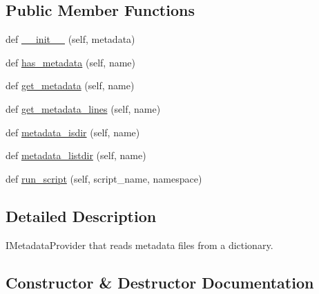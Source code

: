 \subsection*{Public Member Functions}
\begin{DoxyCompactItemize}
\item 
def \hyperlink{classpip_1_1__internal_1_1utils_1_1pkg__resources_1_1DictMetadata_adc3684b3afd09b7499b708c7e9e97de9}{\+\_\+\+\_\+init\+\_\+\+\_\+} (self, metadata)
\item 
def \hyperlink{classpip_1_1__internal_1_1utils_1_1pkg__resources_1_1DictMetadata_a7af10f0f2a69c9e46d96e121dd5c36ea}{has\+\_\+metadata} (self, name)
\item 
def \hyperlink{classpip_1_1__internal_1_1utils_1_1pkg__resources_1_1DictMetadata_a786bc2457039886cd8a89039493526c3}{get\+\_\+metadata} (self, name)
\item 
def \hyperlink{classpip_1_1__internal_1_1utils_1_1pkg__resources_1_1DictMetadata_a6eeb861c7325f20d7b3338b7489daec0}{get\+\_\+metadata\+\_\+lines} (self, name)
\item 
def \hyperlink{classpip_1_1__internal_1_1utils_1_1pkg__resources_1_1DictMetadata_aa99ca5e0c4dd4d5f3ab8a8cdf1a023f5}{metadata\+\_\+isdir} (self, name)
\item 
def \hyperlink{classpip_1_1__internal_1_1utils_1_1pkg__resources_1_1DictMetadata_ad5751d4dc43029799017b29c5dda18d0}{metadata\+\_\+listdir} (self, name)
\item 
def \hyperlink{classpip_1_1__internal_1_1utils_1_1pkg__resources_1_1DictMetadata_ac380bc5c3181293e36e9016fb1269272}{run\+\_\+script} (self, script\+\_\+name, namespace)
\end{DoxyCompactItemize}


\subsection{Detailed Description}
\begin{DoxyVerb}IMetadataProvider that reads metadata files from a dictionary.\end{DoxyVerb}
 

\subsection{Constructor \& Destructor Documentation}
\mbox{\label{classpip_1_1__internal_1_1utils_1_1pkg__resources_1_1DictMetadata_adc3684b3afd09b7499b708c7e9e97de9}} 
